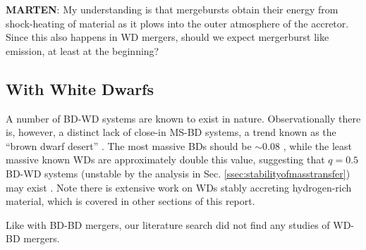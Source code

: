 \textbf{MARTEN}: My understanding is that mergebursts obtain their energy from shock-heating of material as it plows into the outer atmosphere of the accretor.  Since this also happens in WD mergers, should we expect mergerburst like emission, at least at the beginning?

\subsection{With White Dwarfs}

A number of BD-WD systems are known to exist in nature.  Observationally there is, however, a distinct lack of close-in MS-BD systems, a trend known as the ``brown dwarf desert'' \citep{stamw08}.  The most massive BDs should be $\sim 0.08$ {\Msun}, while the least massive known WDs are approximately double this value, suggesting that $q = 0.5$ BD-WD systems (unstable by the analysis in Sec. \ref{ssec:stabilityofmasstransfer}) may exist \citep{brow+11}.  Note there is extensive work on WDs stably accreting hydrogen-rich material, which is covered in other sections of this report.


Like with BD-BD mergers, our literature search did not find any studies of WD-BD mergers.
